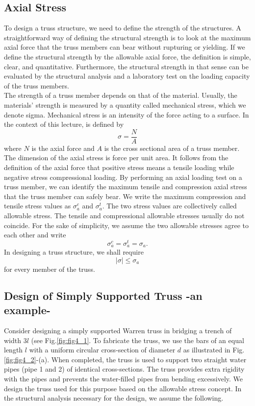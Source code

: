 \documentclass[10pt,a4j]{article}
\begin{document}
\subsection{Axial Stress}
To design a truss structure, we need to define the strength of the structures. A straightforward way of defining the structural strength is to look at the maximum axial force that the truss members can bear without rupturing or yielding. If we define the structural strength by the allowable axial force, the definition is simple, clear, and quantitative. Furthermore, the structural strength in that sense can be evaluated by the structural analysis and a laboratory test on the loading capacity of the truss members.\\ 
The strength of a truss member depends on that of the material. Usually, the materials' strength is measured by a quantity called mechanical stress, which we denote sigma. Mechanical stress is an intensity of the force acting to a surface. In the context of this lecture, is defined by
\begin{equation}
	\sigma=\frac{N}{A}
	\label{eqn:def_sigma}
\end{equation}
where $N$ is the axial force and $A$ is the cross sectional area of a truss member. 
The dimension of the axial stress is force per unit area. It follows from the definition of the axial force that positive stress means a tensile loading while negative stress compressional loading. By performing an axial loading test on a truss member, we can identify the maximum tensile and compression axial stress
that the truss member can safely bear. We write the maximum compression and tensile stress values as $\sigma_{a}^c$ and $\sigma_{a}^t$. The two stress values are collectively called allowable stress.
The tensile and compressional allowable stresses usually do not coincide. For the sake of simplicity, we assume the two allowable stresses agree to each other and write
\begin{equation}
	\sigma_a^c=\sigma_a^t=\sigma_a.
	\label{eqn:sig_a}
\end{equation}
In designing a truss structure, we shall require 
\begin{equation}
	\left| \sigma \right| \leq \sigma_a
	\label{eqn:sig_a_cond}
\end{equation}
for every member of the truss. 
\subsection{Design of Simply Supported Truss -an example-}
Consider designing a simply supported Warren truss in bridging a trench of width 3$l$ (see Fig.\ref{fig:fig4_1}. 
To fabricate the truss, we use the bars of an equal length $l$ with a uniform circular 
cross-section of diameter $d$ as illustrated in Fig.\ref{fig:fig4_2}-(a).
When completed, the truss is used to support two straight water pipes (pipe 1 and 2) 
of identical cross-sections. The truss provides extra rigidity with the pipes and prevents the water-filled pipes from bending excessively. 
We design the truss used for this purpose based on the allowable stress concept. 
In the structural analysis necessary for the design, we assume the following.
\end{document}
